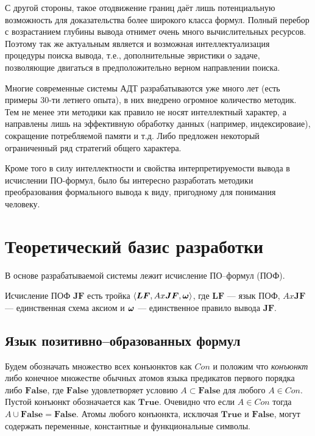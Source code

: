 С другой стороны, такое отодвижение границ даёт лишь потенциальную возможность для доказательства более широкого класса формул. Полный перебор с возрастанием глубины вывода отнимет очень много вычислительных ресурсов. Поэтому так же актуальным является и возможная интеллектуализация процедуры поиска вывода, т.е., дополнительные эвристики о задаче, позволяющие двигаться в предположительно верном направлении поиска.

Многие современные системы АДТ разрабатываются уже много лет (есть примеры 30-ти летнего опыта), в них внедрено огромное количество методик. Тем не менее эти методики как правило не носят интеллектный характер, а направлены лишь на эффективную обработку данных (например, индексироваие), сокращение потребляемой памяти и т.д. Либо предложен некоторый ограниченный ряд стратегий общего характера.

Кроме того в силу интеллектности и свойства интерпретируемости вывода в исчислении ПО-формул, было бы интересно разработать методики преобразования формального вывода к виду, пригодному для понимания человеку.



\section{Теоретический базис разработки}

В основе разрабатываемой системы лежит исчисление ПО--формул (ПОФ).

Исчисление ПОФ $\boldsymbol{JF}$ есть тройка $\left\langle \boldsymbol{LF}, Ax\boldsymbol{JF}, \boldsymbol{\omega} \right\rangle$, где $\boldsymbol{LF}$ --- язык ПОФ, $Ax\boldsymbol{JF}$ --- единственная схема аксиом и $\boldsymbol{\omega}$ --- единственное правило вывода $\boldsymbol{JF}.$

\subsection{Язык позитивно--образованных формул}

Будем обозначать множество всех конъюнктов как $Con$ и положим что {\em конъюнкт} либо конечное множестве обычных атомов языка предикатов первого порядка либо $\boldsymbol{False}$, где $\boldsymbol{False}$ удовлетворяет условию $A \subset \boldsymbol{False} $ для любого $A \in Con$. Пустой конъюнкт обозначается как $\boldsymbol{True}$. Очевидно что если $A \in Con$ тогда $A \cup \boldsymbol{False} = \boldsymbol{False}$. Атомы любого конъюнкта, исключая $\boldsymbol{True}$ и $\boldsymbol{False}$, могут содержать переменные, константные и функциональные символы.

